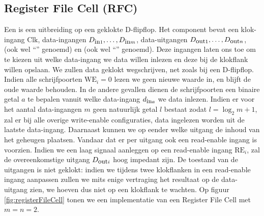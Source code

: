 \subsection{Register File Cell (RFC)}
Een  is een uitbreiding op een geklokte D-flipflop. Het component bevat een klok-ingang $\mbox{Clk}$, data-ingangen $D_{\mbox{\small{in}}1},\ldots,D_{\mbox{\small{in}}m}$, data-uitgangen $D_{\mbox{\small{out}}1},\ldots,D_{\mbox{\small{out}}n}$,  (ook wel ``'' genoemd) en  (ook wel ``'' genoemd). Deze ingangen laten ons toe om te kiezen uit welke data-ingang we data willen inlezen en deze bij de klokflank willen opslaan. We zullen data geklokt wegschrijven, net zoals bij een D-flipflop. Indien alle schrijfpoorten $\mbox{WE}_i=0$ lezen we geen nieuwe waarde in, en blijft de oude waarde behouden. In de andere gevallen dienen de schrijfpoorten een binaire getal $a$ te bepalen vanuit welke data-ingang $d_{\mbox{\small{in}}a}$ we data inlezen. Indien er voor het aantal data-ingangen $m$ geen natuurlijk getal
$l$ bestaat zodat $l=\log_2 m+1$, zal er bij alle overige write-enable configuraties, data ingelezen worden uit de laatste data-ingang. Daarnaast kunnen we op eender welke uitgang de inhoud van het geheugen plaatsen. Vandaar dat er per uitgang ook een read-enable ingang is voorzien. Indien we een laag signaal aanleggen op een read-enable ingang $\mbox{RE}_i$, zal de overeenkomstige uitgang $D_{\mbox{\small{out}}i}$ hoog impedant zijn. De toestand van de uitgangen is niet geklokt: indien we tijdens twee klokflanken in een read-enable ingang aanpassen zullen we mits enige vertraging het resultaat op de data-uitgang zien, we hoeven dus niet op een klokflank te wachten. Op figuur \ref{fig:registerFileCell} tonen we een implementatie van een Register File Cell met $m=n=2$.
